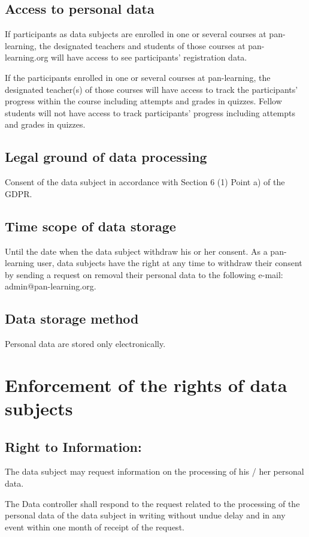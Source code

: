 \documentclass[11pt]{article}
\begin{document}
\subsection{Access to personal data}
If participants as data subjects are enrolled in one or several courses at pan-learning, the designated teachers and students of those courses at pan-learning.org will have access to see participants’ registration data.

If the participants enrolled in one or several courses at pan-learning, the designated teacher(s) of those courses will have access to track the participants’ progress within the course including attempts and grades in quizzes. Fellow students will not have access to track participants’ progress including attempts and grades in quizzes.

\subsection{Legal ground of data processing}
Consent of the data subject in accordance with Section 6 (1) Point a) of the GDPR.

\subsection{Time scope of data storage}
Until the date when the data subject withdraw his or her consent. As a pan-learning user, data subjects have the right at any time to withdraw their consent by sending a request on removal their personal data to the following e-mail: admin@pan-learning.org.  

\subsection{Data storage method}
Personal data are stored only electronically. 

\section{Enforcement of the rights of data subjects}

\subsection{Right to Information:}
The data subject may request information on the processing of his / her personal data.

The Data controller shall respond to the request related to the processing of the personal data of the data subject in writing without undue delay and in any event within one month of receipt of the request.
\end{document}
